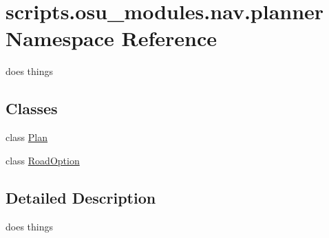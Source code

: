 \hypertarget{namespacescripts_1_1osu__modules_1_1nav_1_1planner}{}\section{scripts.\+osu\+\_\+modules.\+nav.\+planner Namespace Reference}
\label{namespacescripts_1_1osu__modules_1_1nav_1_1planner}


does things  


\subsection*{Classes}
\begin{DoxyCompactItemize}
\item 
class \hyperlink{classscripts_1_1osu__modules_1_1nav_1_1planner_1_1Plan}{Plan}
\item 
class \hyperlink{classscripts_1_1osu__modules_1_1nav_1_1planner_1_1RoadOption}{Road\+Option}
\end{DoxyCompactItemize}


\subsection{Detailed Description}
does things 
